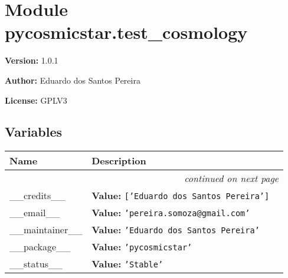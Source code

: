 %
%
%


\section{Module pycosmicstar.test\_cosmology}

    \label{pycosmicstar:test_cosmology}
\textbf{Version:} 1.0.1



\textbf{Author:} Eduardo dos Santos Pereira



\textbf{License:} GPLV3





  \subsection{Variables}

    \vspace{-1cm}
\hspace{\varindent}\begin{longtable}{|p{\varnamewidth}|p{\vardescrwidth}|l}
\cline{1-2}
\cline{1-2} \centering \textbf{Name} & \centering \textbf{Description}& \\
\cline{1-2}
\endhead\cline{1-2}\multicolumn{3}{r}{\small\textit{continued on next page}}\\\endfoot\cline{1-2}
\endlastfoot\raggedright \_\-\_\-c\-r\-e\-d\-i\-t\-s\-\_\-\_\- & \raggedright \textbf{Value:} 
{\tt \texttt{[}\texttt{'}\texttt{Eduardo dos Santos Pereira}\texttt{'}\texttt{]}}&\\
\cline{1-2}
\raggedright \_\-\_\-e\-m\-a\-i\-l\-\_\-\_\- & \raggedright \textbf{Value:} 
{\tt \texttt{'}\texttt{pereira.somoza@gmail.com}\texttt{'}}&\\
\cline{1-2}
\raggedright \_\-\_\-m\-a\-i\-n\-t\-a\-i\-n\-e\-r\-\_\-\_\- & \raggedright \textbf{Value:} 
{\tt \texttt{'}\texttt{Eduardo dos Santos Pereira}\texttt{'}}&\\
\cline{1-2}
\raggedright \_\-\_\-p\-a\-c\-k\-a\-g\-e\-\_\-\_\- & \raggedright \textbf{Value:} 
{\tt \texttt{'}\texttt{pycosmicstar}\texttt{'}}&\\
\cline{1-2}
\raggedright \_\-\_\-s\-t\-a\-t\-u\-s\-\_\-\_\- & \raggedright \textbf{Value:} 
{\tt \texttt{'}\texttt{Stable}\texttt{'}}&\\
\cline{1-2}
\end{longtable}



